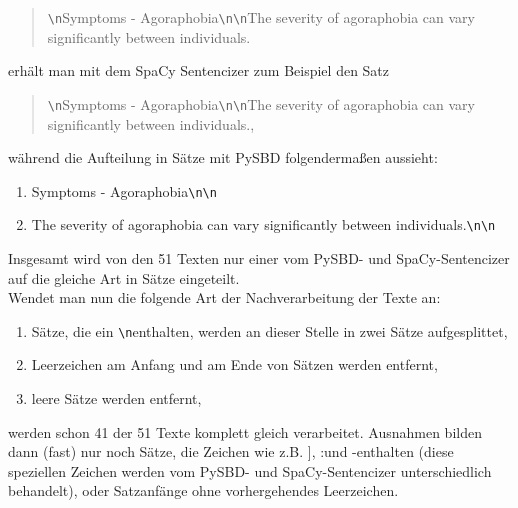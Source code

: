 \begin{quotation}
	\glqq \verb!\n!Symptoms - Agoraphobia\verb!\n!\verb!\n!The severity of agoraphobia can vary significantly between individuals.\grqq
\end{quotation}

erhält man mit dem SpaCy Sentencizer zum Beispiel den Satz

\begin{quotation}
	\glqq \verb!\n!Symptoms - Agoraphobia\verb!\n!\verb!\n!The severity of agoraphobia can vary significantly between individuals.\grqq,
\end{quotation}

während die Aufteilung in Sätze mit PySBD folgendermaßen aussieht:

\begin{enumerate}
	\item \glqq Symptoms - Agoraphobia\verb!\n!\verb!\n!\grqq
	\item \glqq The severity of agoraphobia can vary significantly between individuals.\verb!\n!\verb!\n!\grqq
\end{enumerate}

Insgesamt wird von den 51 Texten nur einer vom PySBD- und SpaCy-Sentencizer auf die gleiche Art in Sätze eingeteilt.\\
Wendet man nun die folgende Art der Nachverarbeitung der Texte an:
\begin{enumerate}
	\item Sätze, die ein \glqq \verb!\n!\grqq enthalten, werden an dieser Stelle in zwei Sätze aufgesplittet,
	\item Leerzeichen am Anfang und am Ende von Sätzen werden entfernt,
	\item leere Sätze werden entfernt,
\end{enumerate}
 werden schon 41 der 51 Texte komplett gleich verarbeitet. Ausnahmen bilden dann (fast) nur noch Sätze, die Zeichen wie z.B. \glqq ]\grqq, \glqq :\grqq und \glqq -\grqq enthalten (diese speziellen Zeichen werden vom PySBD- und SpaCy-Sentencizer unterschiedlich behandelt), oder Satzanfänge ohne vorhergehendes Leerzeichen.\\

 
